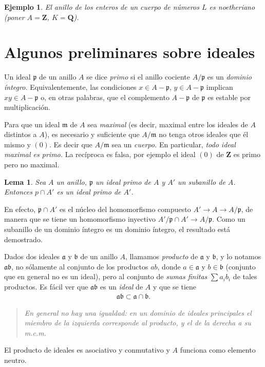 \documentclass[bibtotoc,leqno,spanish]{amsbook}
\newcommand{\QQ}{\mathbf{Q}}
\newcommand{\ZZ}{\mathbf{Z}}
\newcommand{\idl}[1]{\mathfrak{#1}}
\renewcommand{\to}[1][]{\xrightarrow{#1}}
\numberwithin{equation}{section}
\newenvironment{comm}%
	{\begin{quotation}\itshape\Small}
	{\end{quotation}}
\theoremstyle{note}
\theoremstyle{note}
\newtheorem{lemma}{Lema}
\theoremstyle{rem}
\newtheorem*{example*}{Ejemplo}
\numberwithin{theorem}{section}
\numberwithin{proposition}{section}
\numberwithin{definition}{section}
\numberwithin{lemma}{section}
\numberwithin{corollary}{section}
\numberwithin{example}{section}
\numberwithin{footnote}{section}%
\begin{document}
\begin{example*}
El anillo de los enteros de un cuerpo de n\'umeros $L$ es {\em noetheriano} (poner $A = \ZZ$,
$K = \QQ$).
\end{example*}

\section{Algunos preliminares sobre ideales}\label{sec3.3}

Un ideal $\idl{p}$ de un anillo $A$ se dice {\em primo} si el anillo cociente $A/\idl{p}$
es un {\em dominio \'integro.} Equivalentemente, las condiciones $x\in A-\idl{p}$,
$y\in A-\idl{p}$ implican $xy\in A-\idl{p}$ o, en otras palabras, que el complemento
$A-\idl{p}$ de $\idl{p}$ es estable por multiplicaci\'on.

Para que un ideal $\idl{m}$ de $A$ sea {\em maximal} (es decir, maximal entre los ideales de
$A$ distintos a $A$), es necesario y suficiente que $A/\idl{m}$ no tenga otros ideales que \'el mismo
y $(0)$. Es decir que $A/\idl{m}$ sea un {\em cuerpo.}  En particular,
{\em todo ideal maximal es primo.} La rec\'iproca es falsa, por ejemplo el ideal $(0)$ de $\ZZ$
es primo pero no maximal.

\begin{lemma}\label{lem3.3.1}
Sea $A$ un anillo, $\idl{p}$ un ideal primo de $A$ y $A'$ un subanillo de $A$. Entonces
$p\cap A'$ es un ideal primo de $A'$.
\end{lemma}

En efecto, $\idl{p}\cap A'$ es el n\'ucleo del homomorfismo compuesto $A'\to A\to A/\idl{p}$,
de manera que se tiene un homomorfismo inyectivo $A'/\idl{p}\cap A'\to A/\idl{p}$. Como un
subanillo de un dominio \'integro es un dominio \'integro, el resultado est\'a demostrado.

Dados dos ideales $\idl{a}$ y $\idl{b}$ de un anillo $A$, llamamos {\em producto} de $\idl{a}$
y $\idl{b}$, y lo notamos $\idl{a}\idl{b}$, no s\'olamente al conjunto de los productos
$ab$, donde $a\in\idl{a}$ y $b\in\idl{b}$ (conjunto que en general no es un ideal), pero al
conjunto de {\em sumas finitas} $\sum a_{i}b_{i}$ de tales productos. Es f\'acil ver que
$\idl{a}\idl{b}$ es un {\em ideal} de $A$ y que se tiene
\begin{gather*}
\idl{a}\idl{b}\subset\idl{a}\cap\idl{b}.
\end{gather*}

\begin{comm}
En general no hay una igualdad: en un dominio de ideales principales el miembro de la izquierda
corresponde al producto, y el de la derecha a su m.c.m.
\end{comm}
El producto de ideales es asociativo y conmutativo y $A$ funciona como elemento neutro.
\end{document}
